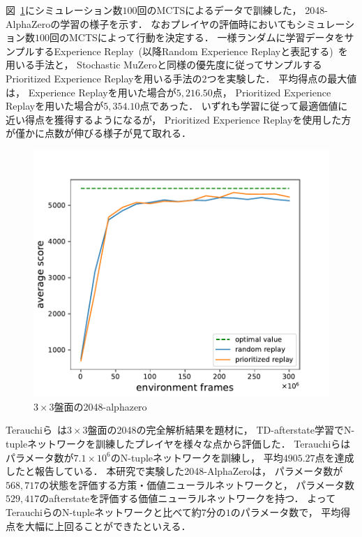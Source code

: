 図~\ref{fig:alphazero_3x3}にシミュレーション数$100$回のMCTSによるデータで訓練した， 2048-AlphaZeroの学習の様子を示す．
なおプレイヤの評価時においてもシミュレーション数$100$回のMCTSによって行動を決定する．
一様ランダムに学習データをサンプルするExperience Replay~(以降Random Experience Replayと表記する)~を用いる手法と， Stochastic MuZeroと同様の優先度に従ってサンプルするPrioritized Experience Replayを用いる手法の$2$つを実験した．
平均得点の最大値は， Experience Replayを用いた場合が$5,216.50$点， Prioritized Experience Replayを用いた場合が$5,354.10$点であった．
いずれも学習に従って最適価値に近い得点を獲得するようになるが， Prioritized Experience Replayを使用した方が僅かに点数が伸びる様子が見て取れる．
\begin{figure}[t]
    \centering
    \includegraphics[width=0.7\linewidth{}]{figures/alphazero_3x3.pdf}
    \caption{$3\times3$盤面の2048-alphazero}
    \label{fig:alphazero_3x3}
\end{figure}

Terauchiら~\cite{Min2048_matsuzaki}は$3\times3$盤面の2048の完全解析結果を題材に， TD-afterstate学習でN-tupleネットワークを訓練したプレイヤを様々な点から評価した．
Terauchiらはパラメータ数が$7.1\times{10}^6$のN-tupleネットワークを訓練し， 平均$4905.27$点を達成したと報告している．
本研究で実験した2048-AlphaZeroは， パラメータ数が$568,717$の状態を評価する方策・価値ニューラルネットワークと， パラメータ数$529,417$のafterstateを評価する価値ニューラルネットワークを持つ．
よってTerauchiらのN-tupleネットワークと比べて約$7$分の$1$のパラメータ数で， 平均得点を大幅に上回ることができたといえる．
